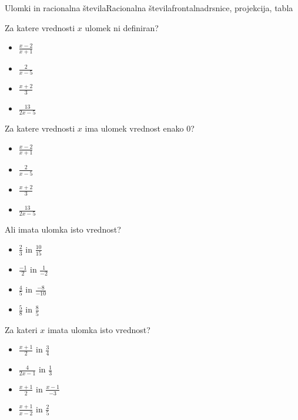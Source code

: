 \begin{priprava}{1}{}{Ulomki in racionalna števila}{Racionalna števila}{frontalna}{drsnice, projekcija, tabla}
\begin{multicols}{2}
            \begin{naloga}
                Za katere vrednosti $x$ ulomek ni definiran?
                \begin{itemize}
                    \item $\frac{x-2}{x+1}$ 
                    \item $\frac{2}{x-5}$ 
                    \item $\frac{x+2}{3}$ 
                    \item $\frac{13}{2x-5}$ 
                \end{itemize}
            \end{naloga}
        

        
            \begin{naloga}
                Za katere vrednosti $x$ ima ulomek vrednost enako $0$?
                \begin{itemize}
                    \item $\frac{x-2}{x+1}$ 
                    \item $\frac{2}{x-5}$ 
                    \item $\frac{x+2}{3}$ 
                    \item $\frac{13}{2x-5}$ 
                \end{itemize}
            \end{naloga}
        

        
            \begin{naloga}
                Ali imata ulomka isto vrednost?
                \begin{itemize}
                    \item $\frac{2}{3}$ in $\frac{10}{15}$ 
                    \item $\frac{-1}{2}$ in $\frac{1}{-2}$ 
                    \item $\frac{4}{5}$ in $\frac{-8}{-10}$ 
                    \item $\frac{5}{8}$ in $\frac{8}{5}$ 
                \end{itemize}
            \end{naloga}
        

        
            \begin{naloga}
                Za kateri $x$ imata ulomka isto vrednost?
                \begin{itemize}
                    \item $\frac{x+1}{2}$ in $\frac{3}{4}$ 
                    \item $\frac{4}{2x-1}$ in $\frac{1}{3}$ 
                    \item $\frac{x+1}{2}$ in $\frac{x-1}{-3}$ 
                    \item $\frac{x+1}{x-2}$ in $\frac{2}{5}$ 
                \end{itemize}
            \end{naloga}
        


\end{multicols}
\end{priprava}
